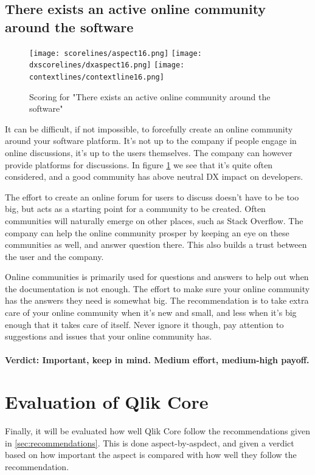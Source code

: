 \documentclass{cslthse-msc}
\begin{document}
    \subsection{There exists an active online community around the software}
    \begin{figure}[H]
        \centering
        \texttt{[image: scorelines/aspect16.png]}
        \texttt{[image: dxscorelines/dxaspect16.png]}
        \texttt{[image: contextlines/contextline16.png]}
        \caption{Scoring for "There exists an active online community around the software"}
        \label{fig:aspect16}
    \end{figure}
    It can be difficult, if not impossible, to forcefully create an online community around your software platform. It's not up to the company if people engage in online discussions, it's up to the users themselves. The company can however provide platforms for discussions. In figure \ref{fig:aspect16} we see that it's quite often considered, and a good community has above neutral DX impact on developers.

    The effort to create an online forum for users to discuss doesn't have to be too big, but acts as a starting point for a community to be created. Often communities will naturally emerge on other places, such as Stack Overflow. The company can help the online community prosper by keeping an eye on these communities as well, and answer question there. This also builds a trust between the user and the company.

    Online communities is primarily used for questions and answers to help out when the documentation is not enough. The effort to make sure your online community has the answers they need is somewhat big. The recommendation is to take extra care of your online community when it's new and small, and less when it's big enough that it takes care of itself. Never ignore it though, pay attention to suggestions and issues that your online community has. \\ \\
    \textbf{Verdict: Important, keep in mind. Medium effort, medium-high payoff.}
    \section{Evaluation of Qlik Core}
    Finally, it will be evaluated how well Qlik Core follow the recommendations given in \ref{sec:recommendations}. This is done aspect-by-aspdect, and given a verdict based on how important the aspect is compared with how well they follow the recommendation.
\end{document}
